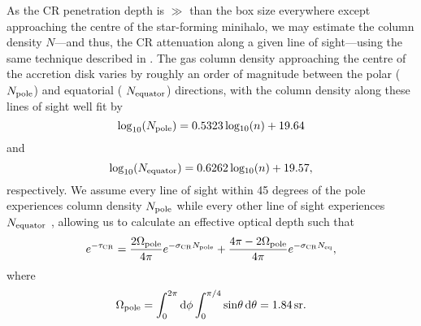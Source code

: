 As the CR penetration depth is $\gg$ than the box size everywhere except approaching the centre of the star-forming minihalo, we may estimate the column density $N$---and thus, the CR attenuation along a given line of sight---using the same technique described in \citet{Hummeletal2015}. 
The gas column density approaching the centre of the accretion disk varies by roughly an order of magnitude between the polar ($N_{\rm \small pole}$) and equatorial ( $N_{\rm \small equator}$) directions, with the column density  along these lines of sight well fit by
\begin{equation}
{\rm log}_{10}(N_{\rm \small pole}) = 0.5323\, {\rm log_{10}}(n) + 19.64
\end{equation}
and
\begin{equation}
{\rm log}_{10}(N_{\rm \small equator}) = 0.6262\, {\rm log_{10}}(n) + 19.57, 
\end{equation}
respectively. We assume every line of sight within 45 degrees of the pole experiences column density $N_{\rm \small pole}$ while every other line of sight experiences $N_{\rm \small equator}$ \citep{Hosokawaetal2011}, allowing us to calculate an effective optical depth such that
\begin{equation}
e^{-\tau_{\rm \small CR}} = \frac{2 \Omega_{\rm \small pole}}{4\pi} e^{-\sigma_{\rm \small CR} N_{\rm \small pole}} + \frac{4\pi - 2 \Omega_{\rm \small pole}}{4\pi} e^{-\sigma_{\rm \small CR} N_{\rm \small eq}},
\end{equation}
where
\begin{equation}
\Omega_{\rm \small pole} = \int_0^{2\pi}{\rm d}\phi \int_0^{\pi/4}{\rm sin}\theta \,{\rm d}\theta = 1.84\,{\rm sr}.
\end{equation}